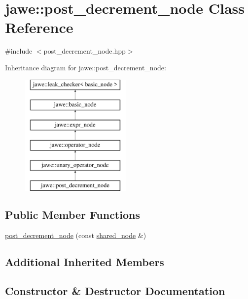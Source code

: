 \hypertarget{classjawe_1_1post__decrement__node}{}\section{jawe\+:\+:post\+\_\+decrement\+\_\+node Class Reference}
\label{classjawe_1_1post__decrement__node}


{\ttfamily \#include $<$post\+\_\+decrement\+\_\+node.\+hpp$>$}

Inheritance diagram for jawe\+:\+:post\+\_\+decrement\+\_\+node\+:\begin{figure}[H]
\begin{center}
\leavevmode
\includegraphics[height=6.000000cm]{classjawe_1_1post__decrement__node}
\end{center}
\end{figure}
\subsection*{Public Member Functions}
\begin{DoxyCompactItemize}
\item 
\hyperlink{classjawe_1_1post__decrement__node_abe378c96af3e079853d71c7275a8a1cc}{post\+\_\+decrement\+\_\+node} (const \hyperlink{namespacejawe_a3f307481d921b6cbb50cc8511fc2b544}{shared\+\_\+node} \&)
\end{DoxyCompactItemize}
\subsection*{Additional Inherited Members}


\subsection{Constructor \& Destructor Documentation}
\mbox{\label{classjawe_1_1post__decrement__node_abe378c96af3e079853d71c7275a8a1cc}} 
